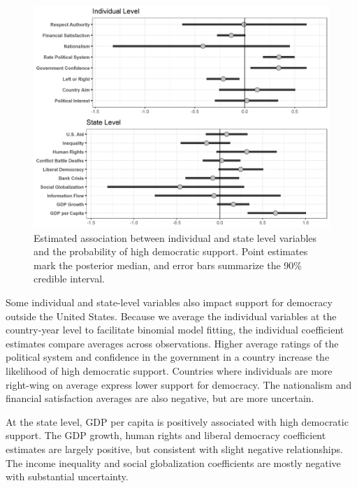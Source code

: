 \documentclass[12pt]{article}
\begin{document}
\begin{figure}
\includegraphics[width = .95\textwidth]{other-levels-vars.png}
\caption{Estimated association between individual and state level variables and the probability of high democratic support. Point estimates mark the posterior median, and error bars summarize the 90\% credible interval.}
\label{fig:other-levels-vars} 
\end{figure}


Some individual and state-level variables also impact support for democracy outside the United States. 
Because we average the individual variables at the country-year level to facilitate binomial model fitting, the individual coefficient estimates compare averages across observations.
Higher average ratings of the political system and confidence in the government in a country increase the likelihood of high democratic support. 
Countries where individuals are more right-wing on average express lower support for democracy. 
The nationalism and financial satisfaction averages are also negative, but are more uncertain.


At the state level, GDP per capita is positively associated with high democratic support. 
The GDP growth, human rights and liberal democracy coefficient estimates are largely positive, but consistent with slight negative relationships. 
The income inequality and social globalization coefficients are mostly negative with substantial uncertainty. 
\end{document}
